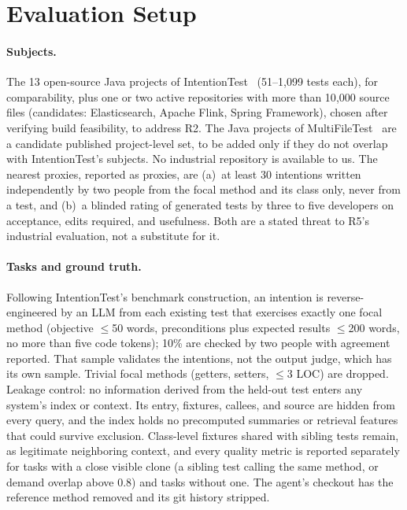 \documentclass[sigconf,nonacm]{acmart}
\begin{document}
\section{Evaluation Setup}
\label{sec:eval}

\paragraph{Subjects.}
The 13 open-source Java projects of IntentionTest~\cite{qi2025intentiontest} (51--1{,}099 tests each), for comparability, plus one or two active repositories with more than 10{,}000 source files (candidates: Elasticsearch, Apache Flink, Spring Framework), chosen after verifying build feasibility, to address R2. The Java projects of MultiFileTest~\cite{wang2026multifiletest} are a candidate published project-level set, to be added only if they do not overlap with IntentionTest's subjects. No industrial repository is available to us. The nearest proxies, reported as proxies, are (a)~at least 30 intentions written independently by two people from the focal method and its class only, never from a test, and (b)~a blinded rating of generated tests by three to five developers on acceptance, edits required, and usefulness. Both are a stated threat to R5's industrial evaluation, not a substitute for it.

\paragraph{Tasks and ground truth.}
Following IntentionTest's benchmark construction, an intention is reverse-engineered by an LLM from each existing test that exercises exactly one focal method (objective $\le$50 words, preconditions plus expected results $\le$200 words, no more than five code tokens); 10\% are checked by two people with agreement reported. That sample validates the intentions, not the output judge, which has its own sample. Trivial focal methods (getters, setters, $\le$3 LOC) are dropped. Leakage control: no information derived from the held-out test enters any system's index or context. Its entry, fixtures, callees, and source are hidden from every query, and the index holds no precomputed summaries or retrieval features that could survive exclusion. Class-level fixtures shared with sibling tests remain, as legitimate neighboring context, and every quality metric is reported separately for tasks with a close visible clone (a sibling test calling the same method, or demand overlap above 0.8) and tasks without one. The agent's checkout has the reference method removed and its git history stripped.
\end{document}
